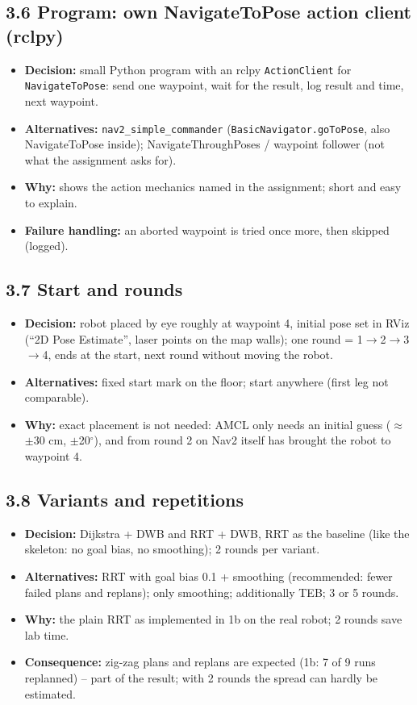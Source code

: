 \documentclass[10pt]{article}
\newcommand{\pkg}[1]{\texttt{#1}}
\begin{document}
\subsection*{3.6 Program: own NavigateToPose action client (rclpy)}
\begin{itemize}
  \item \textbf{Decision:} small Python program with an rclpy \pkg{ActionClient} for \pkg{NavigateToPose}: send one waypoint, wait for the result, log result and time, next waypoint.
  \item \textbf{Alternatives:} \pkg{nav2\_simple\_commander} (\pkg{BasicNavigator.goToPose}, also NavigateToPose inside); NavigateThroughPoses / waypoint follower (not what the assignment asks for).
  \item \textbf{Why:} shows the action mechanics named in the assignment; short and easy to explain.
  \item \textbf{Failure handling:} an aborted waypoint is tried once more, then skipped (logged).
\end{itemize}

\subsection*{3.7 Start and rounds}
\begin{itemize}
  \item \textbf{Decision:} robot placed by eye roughly at waypoint 4, initial pose set in RViz (``2D Pose Estimate'', laser points on the map walls); one round = 1$\rightarrow$2$\rightarrow$3$\rightarrow$4, ends at the start, next round without moving the robot.
  \item \textbf{Alternatives:} fixed start mark on the floor; start anywhere (first leg not comparable).
  \item \textbf{Why:} exact placement is not needed: AMCL only needs an initial guess ($\approx$$\pm$30 cm, $\pm$20$^\circ$), and from round 2 on Nav2 itself has brought the robot to waypoint 4.
\end{itemize}

\subsection*{3.8 Variants and repetitions}
\begin{itemize}
  \item \textbf{Decision:} Dijkstra + DWB and RRT + DWB, RRT as the baseline (like the skeleton: no goal bias, no smoothing); 2 rounds per variant.
  \item \textbf{Alternatives:} RRT with goal bias 0.1 + smoothing (recommended: fewer failed plans and replans); only smoothing; additionally TEB; 3 or 5 rounds.
  \item \textbf{Why:} the plain RRT as implemented in 1b on the real robot; 2 rounds save lab time.
  \item \textbf{Consequence:} zig-zag plans and replans are expected (1b: 7 of 9 runs replanned) -- part of the result; with 2 rounds the spread can hardly be estimated.
\end{itemize}
\end{document}

